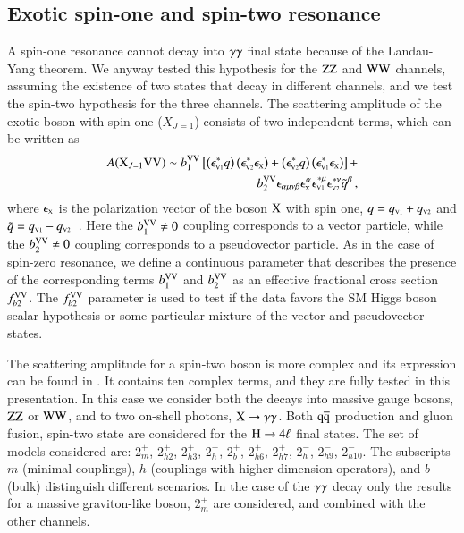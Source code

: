 \subsection{Exotic spin-one and spin-two resonance}
A spin-one resonance cannot decay into $\gamma\gamma$ final state because
of the Landau-Yang theorem. We anyway tested this hypothesis for the
$\mathrm{Z}\mathrm{Z}$ and $\mathrm{W}\mathrm{W}$ channels, assuming the existence of two states
that decay in different channels, and we test the spin-two hypothesis
for the three channels.  The scattering amplitude of the exotic boson
with spin one ($X_{J=1}$) consists of two independent terms, which can
be written as
%
\begin{eqnarray}
A(\mathrm{X}_{J=1} \mathrm{V}\mathrm{V}) \sim b_{1}^{\mathrm{V}\mathrm{V}}  \left[ \left(\epsilon_{\scriptscriptstyle\mathrm{V}1}^{*}q\right)\left(\epsilon_{\scriptscriptstyle\mathrm{V}2}^{*}\epsilon_{\scriptscriptstyle\mathrm{X}}\right) +
\left(\epsilon_{\scriptscriptstyle\mathrm{V}2}^{*}q\right)\left(\epsilon_{\scriptscriptstyle\mathrm{V}1}^{*}\epsilon_{\scriptscriptstyle\mathrm{X}}\right) \right] + \\ \nonumber 
b_{2}^{\mathrm{V}\mathrm{V}}  \epsilon_{\alpha\mu\nu\beta}\epsilon_{\scriptscriptstyle\mathrm{X}}^{\alpha}\epsilon_{\scriptscriptstyle\mathrm{V}1}^{*\mu}\epsilon_{\scriptscriptstyle\mathrm{V}2}^{*\nu}{\tilde q}^{\beta} \,,
\label{eq:ampl-spin1} 
\end{eqnarray}
%
where $\epsilon_{\scriptscriptstyle\mathrm{X}}$ is the polarization vector of the boson $\mathrm{X}$
with spin one, ${q}=q_{\scriptscriptstyle\mathrm{V}1}+q_{\scriptscriptstyle\mathrm{V}2}$ and ${\tilde
  q}=q_{\scriptscriptstyle\mathrm{V}1}-q_{\scriptscriptstyle\mathrm{V}2}$~\cite{Gao:2010qx, Bolognesi:2012mm}.
Here the $b_{1}^{\mathrm{V}\mathrm{V}} \neq 0$ coupling corresponds to a vector
particle, while the $b_{2}^{\mathrm{V}\mathrm{V}}\neq 0$ coupling corresponds to a
pseudovector particle.  As in the case of spin-zero resonance, we
define a continuous parameter that describes the presence of the
corresponding terms $b_{1}^{\mathrm{V}\mathrm{V}} $ and $b_{2}^{\mathrm{V}\mathrm{V}}$ as an effective
fractional cross section $f_{b2}^{\mathrm{V}\mathrm{V}}$.  The $f_{b2}^{\mathrm{V}\mathrm{V}}$
parameter is used to test if the data favors the SM Higgs boson scalar
hypothesis or some particular mixture of the vector and pseudovector
states.

The scattering amplitude for a spin-two boson is more complex and its
expression can be found in \cite{CMS:2014gga}.  It contains ten complex
terms, and they are fully tested in this presentation.  In this case
we consider both the decays into massive gauge bosons, $\mathrm{Z}\mathrm{Z}$ or
$\mathrm{W}\mathrm{W}$, and to two on-shell photons, $\mathrm{X}\to\gamma\gamma$. Both $\mathrm{\mathrm{q}\mathrm{\overline{q}}}$
production and gluon fusion, spin-two state are considered for the
$\mathrm{H}\to4\ell$ final states. The set of models considered are:
$2_m^+$, $2_{h2}^+$, $2_{h3}^+$, $2_h^+$, $2_b^+$, $2_{h6}^+$,
$2_{h7}^+$, $2_h^-$, $2_{h9}^-$, $2_{h10}^-$.  The subscripts $m$
(minimal couplings), $h$ (couplings with higher-dimension operators),
and $b$ (bulk) distinguish different scenarios.  In the case of the
$\gamma\gamma$ decay only the results for a massive graviton-like boson,
$2_m^+$ are considered, and combined with the other channels.
